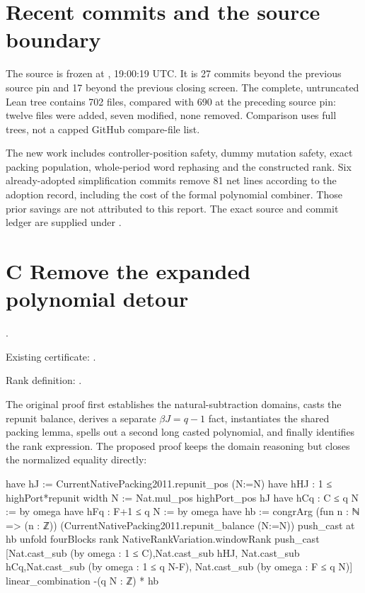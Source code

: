 \section{Recent commits and the source boundary}
The source is frozen at \texttt{\commit}, 19:00:19 UTC. It is 27 commits beyond the previous source pin and 17 beyond the previous closing screen. The complete, untruncated Lean tree contains 702 files, compared with 690 at the preceding source pin: twelve files were added, seven modified, none removed. Comparison uses full trees, not a capped GitHub compare-file list.

The new work includes controller-position safety, dummy mutation safety, exact packing population, whole-period word rephasing and the constructed rank. Six already-adopted simplification commits remove 81 net lines according to the adoption record, including the cost of the formal polynomial combiner. Those prior savings are not attributed to this report. The exact source and commit ledger are supplied under .


\newpage
\section{C Remove the expanded polynomial detour}
 .\par
Existing certificate: .\par
Rank definition: .

The original proof first establishes the natural-subtraction domains, casts the repunit balance, derives a separate $\beta J=q-1$ fact, instantiates the shared packing lemma, spells out a second long casted polynomial, and finally identifies the rank expression. The proposed proof keeps the domain reasoning but closes the normalized equality directly:

\begin{Lean}
  have hJ := CurrentNativePacking2011.repunit_pos (N:=N)
  have hHJ : 1 ≤ highPort*repunit width N := Nat.mul_pos highPort_pos hJ
  have hCq : C ≤ q N := by omega
  have hFq : F+1 ≤ q N := by omega
  have hb := congrArg (fun n : ℕ => (n : ℤ))
    (CurrentNativePacking2011.repunit_balance (N:=N))
  push_cast at hb
  unfold fourBlocks rank NativeRankVariation.windowRank
  push_cast [Nat.cast_sub (by omega : 1 ≤ C),Nat.cast_sub hHJ,
    Nat.cast_sub hCq,Nat.cast_sub (by omega : 1 ≤ q N-F),
    Nat.cast_sub (by omega : F ≤ q N)]
  linear_combination -(q N : ℤ) * hb
\end{Lean}

